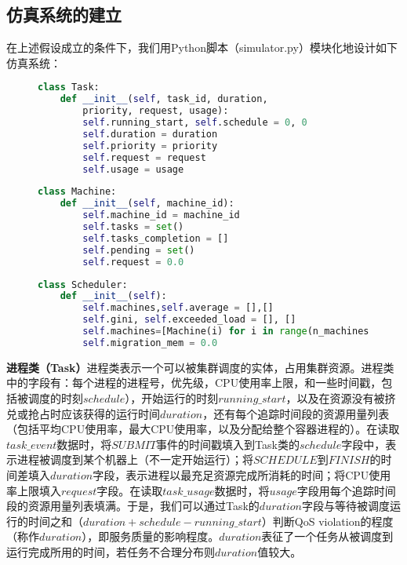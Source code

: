 \subsection{仿真系统的建立}
在上述假设成立的条件下，我们用Python脚本（simulator.py）模块化地设计如下仿真系统：
\begin{figure}
\centering
\begin{minipage}[c]{0.62\textwidth}
\begin{lstlisting}[language=python]
class Task:
    def __init__(self, task_id, duration,
        priority, request, usage):
        self.running_start, self.schedule = 0, 0
        self.duration = duration
        self.priority = priority
        self.request = request
        self.usage = usage
\end{lstlisting}
\end{minipage}
\begin{minipage}[c]{0.5\textwidth}
\begin{lstlisting}[language=python]
class Machine:
    def __init__(self, machine_id):
        self.machine_id = machine_id
        self.tasks = set()
        self.tasks_completion = []
        self.pending = set()
        self.request = 0.0
\end{lstlisting}
\end{minipage}
\begin{minipage}[c]{0.8\textwidth}

\begin{lstlisting}[language=python]
class Scheduler:
    def __init__(self):
        self.machines,self.average = [],[]
        self.gini, self.exceeded_load = [], []
        self.machines=[Machine(i) for i in range(n_machines)]
        self.migration_mem = 0.0
\end{lstlisting}
\end{minipage}
\end{figure}

\noindent\textbf{进程类（Task）}\quad \label{chap:task}进程类表示一个可以被集群调度的实体，占用集群资源。进程类中的字段有：每个进程的进程号，优先级，CPU使用率上限，和一些时间戳，包括被调度的时刻$schedule$），开始运行的时刻$running\_start$，以及在资源没有被挤兑或抢占时应该获得的运行时间$duration$，还有每个追踪时间段的资源用量列表（包括平均CPU使用率，最大CPU使用率，以及分配给整个容器进程的）。在读取$task\_event$数据时，将$SUBMIT$事件的时间戳填入到Task类的$schedule$字段中，表示进程被调度到某个机器上（不一定开始运行）；将$SCHEDULE$到$FINISH$的时间差填入$duration$字段，表示进程以最充足资源完成所消耗的时间；将CPU使用率上限填入$request$字段。在读取$task\_usage$数据时，将$usage$字段用每个追踪时间段的资源用量列表填满。于是，我们可以通过Task的$duration$字段与等待被调度运行的时间之和（$duration + schedule - running\_start$）判断QoS violation的程度（称作$duration$），即服务质量的影响程度。$duration$表征了一个任务从被调度到运行完成所用的时间，若任务不合理分布则$duration$值较大。

